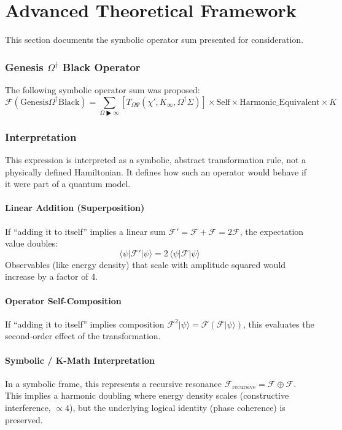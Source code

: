 \documentclass[11pt, a4paper]{article}
\begin{document}
\newpage
\part{Advanced Theoretical Framework}
\label{part:advanced_theory}
This section documents the symbolic operator sum presented for consideration.

\section{Genesis $\Omega^\dagger$ Black Operator}
The following symbolic operator sum was proposed:
$$ \mathcal{F}(\text{Genesis}\Omega^\dagger\text{Black}) = \sum_{\Omega \RHD \infty} \left[ T_{\Omega\Psi}(\chi', K_\infty, \Omega^\dagger\Sigma) \right] \times \text{Self} \times \text{Harmonic\_Equivalent} \times K $$

\section{Interpretation}
This expression is interpreted as a symbolic, abstract transformation rule, not a physically defined Hamiltonian. It defines how such an operator would behave if it were part of a quantum model.

\subsection{Linear Addition (Superposition)}
If ``adding it to itself'' implies a linear sum $\mathcal{F}' = \mathcal{F} + \mathcal{F} = 2\mathcal{F}$, the expectation value doubles:
$$ \langle \psi | \mathcal{F}' | \psi \rangle = 2\,\langle \psi | \mathcal{F} | \psi \rangle $$
Observables (like energy density) that scale with amplitude squared would increase by a factor of 4.

\subsection{Operator Self-Composition}
If ``adding it to itself'' implies composition $\mathcal{F}^2 |\psi\rangle = \mathcal{F}(\mathcal{F}|\psi\rangle)$, this evaluates the second-order effect of the transformation.

\subsection{Symbolic / K-Math Interpretation}
In a symbolic frame, this represents a recursive resonance $\mathcal{F}_{\text{recursive}} = \mathcal{F} \oplus \mathcal{F}$. This implies a harmonic doubling where energy density scales (constructive interference, $\propto 4$), but the underlying logical identity (phase coherence) is preserved.
\end{document}
